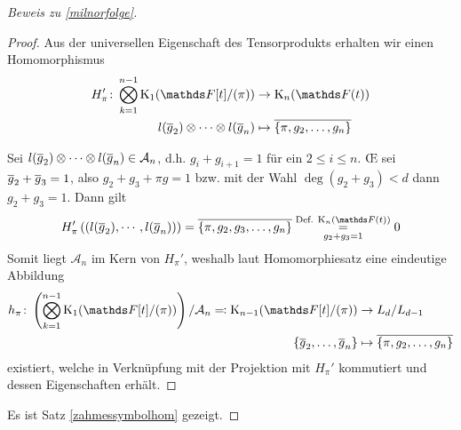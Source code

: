 \documentclass[ngerman,fontsize=11pt, paper=a4, parskip=half, titlepage=true, toc=bib]{scrartcl}
\begin{document}
\begin{proof}[Beweis zu \ref{milnorfolge}]
\begin{proof}
    Aus der universellen Eigenschaft des Tensorprodukts erhalten wir
    einen Homomorphismus
    \begin{align*}
      H_\pi'\colon\bigotimes_{k=1}^{n-1}\K_1(\Ftpi)
      &\to\KnFt\\
      l(\ov g_2)\otimes\dotsb\otimes l(\ov g_n)
      &\mapsto \ov{\{\pi,g_2,\dotsc,g_n\}}
    \end{align*}
    
    Sei $l(\overline g_2)\otimes\dotsb\otimes l(\overline g_n)\in\mathcal{A}_n$,
    d.h. $g_i+g_{i+1}=1$ für ein $2\leq i\leq n$.
    \OE{} sei $\overline g_2 + \overline g_3=1$, 
    also $g_2 + g_3 +\pi g=1$ bzw. mit der Wahl
    $\deg(g_2+g_3)<d$ dann $g_2+g_3=1$. Dann gilt
    \begin{gather*}
      H'_\pi\left(\left(l(\ov g_2),\dotsb,l(\ov g_n)\right)\right)
      = \ov{\{\pi,g_2,g_3, \dotsc,g_n\}}
      \overset{\text{Def. $\KnFt$}}{\underset{g_2+g_3=1}{=}} 0
    \end{gather*}
    Somit liegt $\mathcal{A}_n$ im Kern von $H_\pi'$, weshalb laut
    Homomorphiesatz eine eindeutige Abbildung
    \begin{align*}
      h_\pi\colon 
      \left(\bigotimes_{k=1}^{n-1}\K_1(\Ftpi)\right)/\mathcal{A}_n
      \eqqcolon \K_{n-1}(\Ftpi)&\to L_d/L_{d-1}\\
      \{\ov g_2,\dotsc,\ov g_n\}&\mapsto \ov{\{\pi,g_2,\dotsc,g_n\}}
    \end{align*}
    existiert, welche in Verknüpfung mit der Projektion mit 
    $H_\pi'$ kommutiert und dessen Eigenschaften erhält.
    
    

  \end{proof}

  
  Es ist Satz \ref{zahmessymbolhom} gezeigt.
\end{proof}





\printindex

\nocite{*}
\printbibliography
\end{document}

